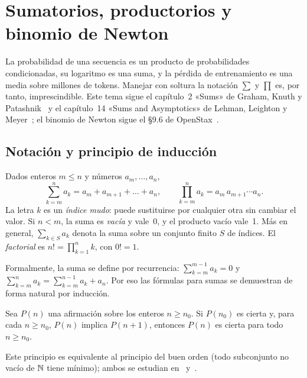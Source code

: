 \chapter{Sumatorios, productorios y binomio de Newton}
\label{tema:4}

La probabilidad de una secuencia es un producto de probabilidades condicionadas, su logaritmo es una suma, y la pérdida de entrenamiento es una media sobre millones de tokens. Manejar con soltura la notación $\sum$ y $\prod$ es, por tanto, imprescindible. Este tema sigue el capítulo~2 «Sums» de Graham, Knuth y Patashnik~\cite{gkp} y el capítulo~14 «Sums and Asymptotics» de Lehman, Leighton y Meyer~\cite{mcs}; el binomio de Newton sigue el §9.6 de OpenStax~\cite{openstax}.

\section{Notación y principio de inducción}

\begin{definicion}
Dados enteros $m\le n$ y números $a_m,\dots,a_n$,
\[
\sum_{k=m}^{n}a_k=a_m+a_{m+1}+\dots+a_n,\qquad \prod_{k=m}^{n}a_k=a_m\,a_{m+1}\cdots a_n.
\]
La letra $k$ es un \emph{índice mudo}: puede sustituirse por cualquier otra sin cambiar el valor. Si $n<m$, la suma es \emph{vacía} y vale~0, y el producto vacío vale~1. Más en general, $\sum_{k\in S}a_k$ denota la suma sobre un conjunto finito $S$ de índices. El \emph{factorial} es $n!=\prod_{k=1}^{n}k$, con $0!=1$.
\end{definicion}

Formalmente, la suma se define por recurrencia: $\sum_{k=m}^{m-1}a_k=0$ y $\sum_{k=m}^{n}a_k=\sum_{k=m}^{n-1}a_k+a_n$. Por eso las fórmulas para sumas se demuestran de forma natural por inducción.

\begin{teorema}\label{teo:induccion}
Sea $P(n)$ una afirmación sobre los enteros $n\ge n_0$. Si $P(n_0)$ es cierta y, para cada $n\ge n_0$, $P(n)$ implica $P(n+1)$, entonces $P(n)$ es cierta para todo $n\ge n_0$.
\end{teorema}

Este principio es equivalente al principio del buen orden (todo subconjunto no vacío de $\mathbb{N}$ tiene mínimo); ambos se estudian en~\cite[cap.~2 y~5]{mcs} y~\cite[cap.~10]{hammack}.

